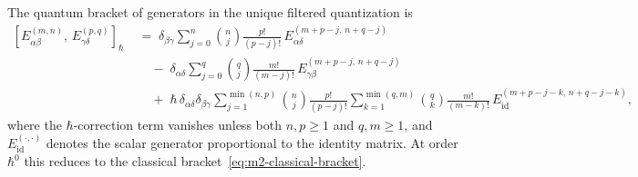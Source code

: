 \begin{theorem}
The quantum bracket of generators in the unique filtered quantization is
\begin{equation}%
\begin{split}
[E^{(m,n)}_{\alpha\beta},\, E^{(p,q)}_{\gamma\delta}]_{\hbar}
&\;=\;
\delta_{\beta\gamma}
\sum_{j=0}^{n}\binom{n}{j}
\frac{p!}{(p-j)!}\,
E^{(m+p-j,\,n+q-j)}_{\alpha\delta}
\\
&\quad\;-\;
\delta_{\alpha\delta}
\sum_{j=0}^{q}\binom{q}{j}
\frac{m!}{(m-j)!}\,
E^{(m+p-j,\,n+q-j)}_{\gamma\beta}
\\
&\quad\;+\;
\hbar\,\delta_{\alpha\delta}\delta_{\beta\gamma}
\sum_{j=1}^{\min(n,p)}
\binom{n}{j}\frac{p!}{(p-j)!}
\sum_{k=1}^{\min(q,m)}
\binom{q}{k}\frac{m!}{(m-k)!}\,
E^{(m+p-j-k,\,n+q-j-k)}_{\mathrm{id}},
\end{split}
\end{equation}
where the $\hbar$-correction term vanishes unless both $n,p\ge 1$ and
$q,m\ge 1$, and $E^{(\cdot,\cdot)}_{\mathrm{id}}$ denotes the
scalar generator proportional to the identity matrix. At order $\hbar^0$
this reduces to the classical bracket~\eqref{eq:m2-classical-bracket}.
\end{theorem}

